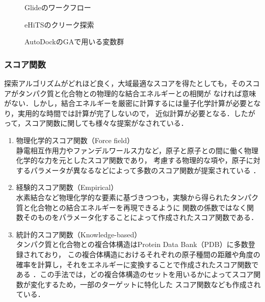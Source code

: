 \begin{figure}[htb]
 \begin{center}
  \caption{Glideのワークフロー\cite{Friesner2004}}
  \label{fig:glide_flowchart}
 \end{center}
\end{figure}
\begin{figure}[htb]
 \begin{center}
  \caption{eHiTSのクリーク探索}
  \label{fig:eHiTS_clique}
 \end{center}
\end{figure}
\begin{figure}[htb]
 \begin{center}
  \caption{AutoDockのGAで用いる変数群}
  \label{fig:AutoDock_gene}
 \end{center}
\end{figure}


\subsubsection{スコア関数}
探索アルゴリズムがどれほど良く，大域最適なスコアを得たとしても，そのスコアがタンパク質と化合物との物理的な結合エネルギーとの相関が
なければ意味がない．しかし，結合エネルギーを厳密に計算するには量子化学計算が必要となり，実用的な時間では計算が完了しないので，
近似計算が必要となる．したがって，スコア関数に関しても様々な提案がなされている．
\begin{enumerate}
\item 物理化学的スコア関数（Force field）\\
	静電相互作用力やファンデルワールス力など，原子と原子との間に働く物理化学的な力を元としたスコア関数であり，
	考慮する物理的な項や，原子に対するパラメータが異なるなどによって多数のスコア関数が提案されている
	\cite{Morris1998, Ewing2001, Jones1997}．
\item 経験的スコア関数（Empirical）\\
	水素結合など物理化学的な要素に基づきつつも，実験から得られたタンパク質と化合物との結合エネルギーを再現できるように
	関数の係数ではなく関数そのものをパラメータ化することによって作成されたスコア関数である\cite{Wang2002, Gehlhaar1995, Eldridge1997}．
\item 統計的スコア関数（Knowledge-based）\\
	タンパク質と化合物との複合体構造はProtein Data Bank（PDB）\cite{Berman2000}に多数登録されており，
	この複合体構造におけるそれぞれの原子種間の距離や角度の確率を計算し，それをエネルギーに変換することで作成されたスコア関数である
	\cite{Muegge2006, Xue2010, Gohlke2000, Huang2010}．この手法では，どの複合体構造のセットを用いるかによってスコア関数が変化するため，一部のターゲットに特化した
	スコア関数なども作成されている\cite{Seifert2009}．
\end{enumerate}

